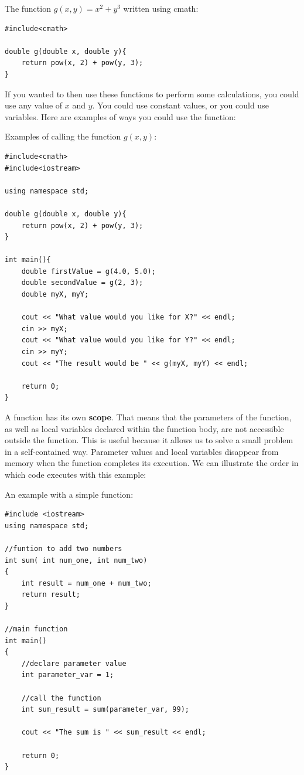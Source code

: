 \begin{example}
    The function $g(x,y) = x^2+y^3$ written using cmath:

    \begin{verbatim}
#include<cmath>

double g(double x, double y){
    return pow(x, 2) + pow(y, 3);
} 
    \end{verbatim}
\end{example}

If you wanted to then use these functions to perform some calculations, you could use any value of $x$ and $y$. You could use constant values, or you could use variables. Here are examples of ways you could use the function:

\begin{example}
    Examples of calling the function $g(x,y)$:

    \begin{verbatim}
#include<cmath>
#include<iostream>

using namespace std;

double g(double x, double y){
    return pow(x, 2) + pow(y, 3);
} 

int main(){
    double firstValue = g(4.0, 5.0);
    double secondValue = g(2, 3); 
    double myX, myY;

    cout << "What value would you like for X?" << endl;
    cin >> myX;
    cout << "What value would you like for Y?" << endl;
    cin >> myY;
    cout << "The result would be " << g(myX, myY) << endl;

    return 0;
}

    \end{verbatim}
\end{example}

A function has its own \textbf{scope}. That means that the parameters of the function, as well as local variables declared within the function body, are not accessible outside the function. This is useful because it allows us to solve a small problem in a self-contained way. Parameter values and local variables disappear from memory when the function completes its execution. We can illustrate the order in which code executes with this example:

\begin{example}
    An example with a simple function:
\begin{verbatim}
#include <iostream>
using namespace std;

//funtion to add two numbers
int sum( int num_one, int num_two)
{
    int result = num_one + num_two;
    return result;
}

//main function
int main()
{
    //declare parameter value
    int parameter_var = 1;
    
    //call the function
    int sum_result = sum(parameter_var, 99);
    
    cout << "The sum is " << sum_result << endl;
    
    return 0;
}    
\end{verbatim}
\end{example}

